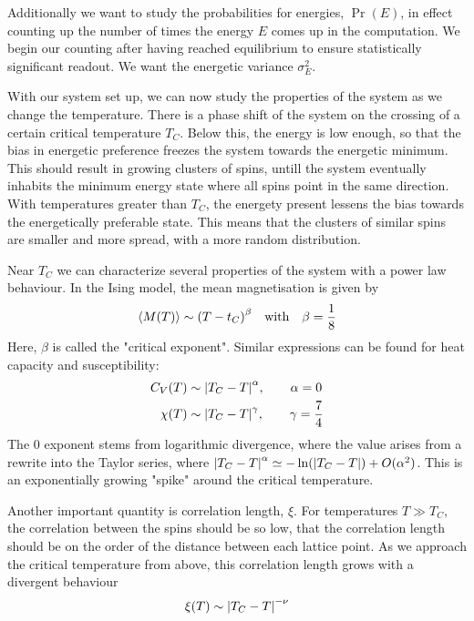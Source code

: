 \documentclass[10pt, twocolumn]{revtex4-1}
\begin{document}
Additionally we want to study the probabilities for energies, $\Pr(E)$, in effect counting up the number of times the energy $E$ comes up in the computation.
We begin our counting after having reached equilibrium to ensure statistically significant readout. We want the energetic variance $\sigma_E^2$.

With our system set up, we can now study the properties of the system as we change the temperature. There is a phase shift of the system on the crossing of
a certain critical temperature $T_C$. Below this, the energy is low enough, so that the bias in energetic preference freezes the system towards the energetic
minimum. This should result in growing clusters of spins, untill the system eventually inhabits the minimum energy state where all spins point in the same
direction. With temperatures greater than $T_C$, the energety present lessens the bias towards the energetically preferable state. This means that the clusters
of similar spins are smaller and more spread, with a more random distribution.

Near $T_C$ we can characterize several properties of the system with a power law behaviour. In the Ising model, the mean magnetisation is given by
\[ \ev{M(T)} \sim \qty( T - t_C )^{\beta} \qq{with} \beta = \frac{1}{8} \]
Here, $\beta$ is called the "critical exponent". %
Similar expressions can be found for heat capacity and susceptibility:
\begin{align*}
    C_V(T) &\sim \qty| T_C - T |^{\alpha}, \qq{} \alpha = 0 \\
    \chi(T) &\sim \qty| T_C - T |^{\gamma}, \qq{} \gamma = \frac{7}{4}
\end{align*}
The 0 exponent stems from logarithmic divergence, where the value
arises from a rewrite into the Taylor series, where $\qty| T_C - T |^{\alpha} \simeq -\ln(\qty| T_C - T | ) + O(\alpha^2)$. This is an exponentially growing
"spike" around the critical temperature.


Another important quantity is correlation length, $\xi$. For temperatures $T \gg T_C$, the correlation between the spins should be so low, that the
correlation length should be on the order of the distance between each lattice point. As we approach the critical temperature from above, this correlation
length grows with a divergent behaviour
\[ \xi(T) \sim \qty| T_C - T |^{-\nu} \]
\end{document}
